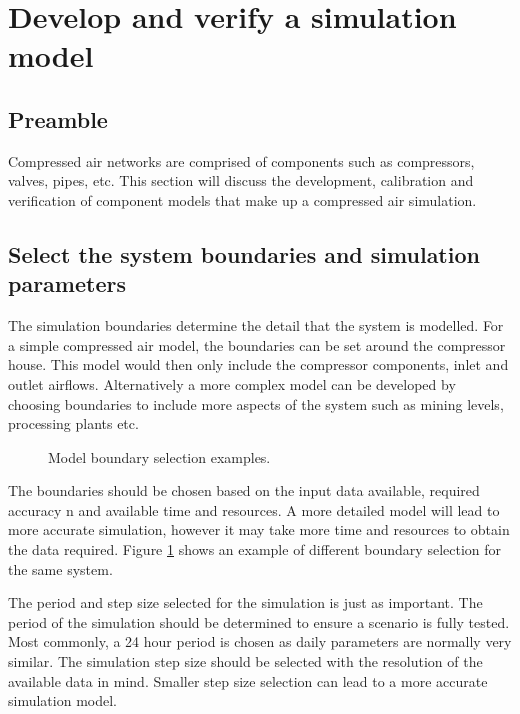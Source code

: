 \section{Develop and verify a simulation model}
	\subsection{Preamble}
	Compressed air networks are comprised of components such as compressors, valves, pipes, etc. This section will discuss the development, calibration and verification of component models that make up a compressed air simulation. 
	
	\subsection{Select the system boundaries and simulation parameters}
	The simulation boundaries determine the detail that the system is modelled. For a simple compressed air model, the boundaries can be set around the compressor house. This model would then only include the compressor components, inlet and outlet airflows. Alternatively a more complex model can be developed by choosing boundaries to include more aspects of the system such as mining levels, processing plants etc.
	
	 \begin{figure}[h]
	 	\centering
	 	\caption{ Model boundary selection examples.}
	 	\label{fig: Sensitivity}
	 \end{figure}
 
	\par 
	The boundaries should be chosen based on the input data available, required accuracy n and available time and resources. A more detailed model will lead to more accurate simulation, however it may take more time and resources to obtain the data required. Figure \cref{fig: Sensitivity} shows an example of different boundary selection for the same system.
	\par
	The period and step size selected for the simulation is just as important. The period of the simulation should be determined to ensure a scenario is fully tested. Most commonly, a 24 hour period is chosen as daily parameters are normally very similar. The simulation step size should be selected with the resolution of the available data in mind. Smaller step size selection can lead to a more accurate simulation model. 
